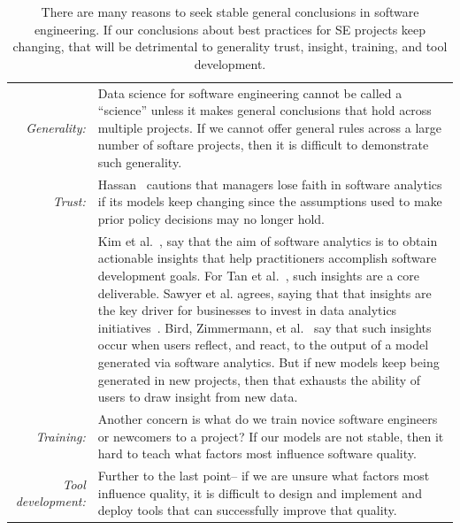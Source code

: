 \begin{table}[!b]
  \caption{There are many reasons to seek stable general conclusions in software
          engineering. If our conclusions about best practices for SE projects keep
          changing, that will be detrimental to generality trust, insight, training, and tool
          development.}\label{tbl:why}
 {  \begin{tabular}{|rp{.8\linewidth}|}\hline
 \rowcolor{blue!10}
  {\em Generality:}& Data science for software engineering cannot be called a ``science'' unless it makes general conclusions that hold across  multiple  projects. If we cannot offer general rules across a large number of softare projects, then it is   difficult to demonstrate such generality.
\\
{\em Trust:}&
 Hassan~\cite{Hassan17} cautions that 
managers lose faith
 in software analytics if its models keep changing
 since  the assumptions used to 
make prior policy decisions may no longer hold.
\\
 \rowcolor{blue!10}{\em Insight:}&
Kim et al.~\cite{Kim2016},
 say  that the aim of software analytics is to
        obtain actionable   insights
       that
        help practitioners accomplish   software development goals.
 For Tan et al.~\cite{tan2016defining}, 
        such   insights  are a core deliverable. 
        Sawyer et al. agrees, saying that  that  insights are the key driver for businesses 
        to invest in data analytics initiatives~\cite{sawyer2013bi}.  
           Bird, Zimmermann, et al.~\cite{Bird:2015} say that such  insights occur when
        users reflect, and react, to the output of a model generated
        via software analytics. But if  new models keep being generated in new projects,  then that
          exhausts the ability of  users to draw insight from  new data.\\
       {\em Training:} &Another concern is what do we train novice software engineers
          or newcomers to a project?  
          If our models are not stable, then it hard to teach
          what factors  most influence software quality.\\
   \rowcolor{blue!10}        {\em Tool development:}&Further to the last point-- if we are unsure what 
          factors most influence quality, it is difficult to design and implement and deploy tools
          that can successfully improve that quality.\\\hline
          \end{tabular}}
          \end{table}    
          
